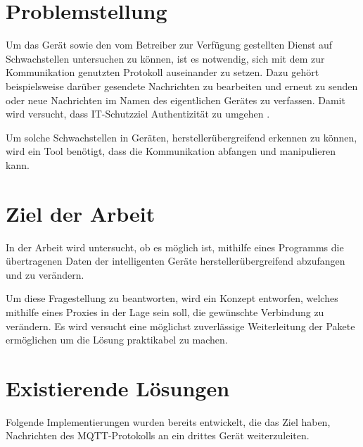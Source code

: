 \section{Problemstellung}
    Um das Gerät sowie den vom Betreiber zur Verfügung gestellten Dienst auf Schwachstellen untersuchen zu können, ist es notwendig, sich mit dem zur Kommunikation genutzten Protokoll auseinander zu setzen. Dazu gehört beispielsweise darüber gesendete Nachrichten zu bearbeiten und erneut zu senden oder neue Nachrichten im Namen des eigentlichen Gerätes zu verfassen. Damit wird versucht, dass IT-Schutzziel Authentizität zu umgehen \cite{Bedner2010}.
        
    Um solche Schwachstellen in Geräten, herstellerübergreifend erkennen zu können, wird ein Tool benötigt, dass die Kommunikation abfangen und manipulieren kann.

\section{Ziel der Arbeit}
    In der Arbeit wird untersucht, ob es möglich ist, mithilfe eines Programms die übertragenen Daten der intelligenten Geräte herstellerübergreifend abzufangen und zu verändern.

    Um diese Fragestellung zu beantworten, wird ein Konzept entworfen, welches mithilfe eines Proxies in der Lage sein soll, die gewünschte Verbindung zu verändern. Es wird versucht eine möglichst zuverlässige Weiterleitung der Pakete ermöglichen um die Lösung praktikabel zu machen. %
    
\section{Existierende Lösungen}
    Folgende Implementierungen wurden bereits entwickelt, die das Ziel haben, Nachrichten des \ac{MQTT}-Protokolls an ein drittes Gerät weiterzuleiten.
    
